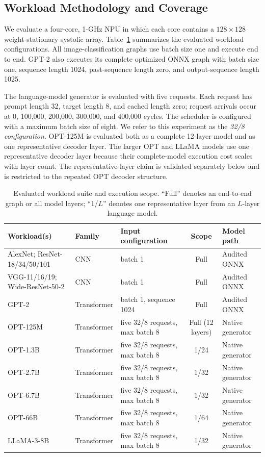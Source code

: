 \subsection{Workload Methodology and Coverage}
\label{sec:workload-methodology}

We evaluate a four-core, 1-GHz NPU in which each core contains a
$128\times128$ weight-stationary systolic array.  Table~\ref{tab:workload-suite}
summarizes the evaluated workload configurations.  All image-classification
graphs use batch size one and execute end to end.  GPT-2 also executes its
complete optimized ONNX graph with batch size one, sequence length 1024,
past-sequence length zero, and output-sequence length 1025.

The language-model generator is evaluated with five requests.  Each request
has prompt length 32, target length 8, and cached length zero; request arrivals
occur at 0, 100,000, 200,000, 300,000, and 400,000 cycles.  The scheduler is
configured with a maximum batch size of eight.  We refer to this experiment as
the \emph{32/8 configuration}.  OPT-125M is evaluated both as a complete
12-layer model and as one representative decoder layer.  The larger OPT and
LLaMA models use one representative decoder layer because their complete-model
execution cost scales with layer count.  The representative-layer claim is
validated separately below and is restricted to the repeated OPT decoder
structure.

\begin{table}[t]
  \centering
  \caption{Evaluated workload suite and execution scope.  ``Full'' denotes an
  end-to-end graph or all model layers; ``1/$L$'' denotes one representative
  layer from an $L$-layer language model.}
  \label{tab:workload-suite}
  \begin{tabular}{lllcl}
    \toprule
    Workload(s) & Family & Input configuration & Scope & Model path \\
    \midrule
    AlexNet; ResNet-18/34/50/101 & CNN & batch 1 & Full & Audited ONNX \\
    VGG-11/16/19; Wide-ResNet-50-2 & CNN & batch 1 & Full & Audited ONNX \\
    GPT-2 & Transformer & batch 1, sequence 1024 & Full & Audited ONNX \\
    OPT-125M & Transformer & five 32/8 requests, max batch 8 & Full (12 layers) & Native generator \\
    OPT-1.3B & Transformer & five 32/8 requests, max batch 8 & 1/24 & Native generator \\
    OPT-2.7B & Transformer & five 32/8 requests, max batch 8 & 1/32 & Native generator \\
    OPT-6.7B & Transformer & five 32/8 requests, max batch 8 & 1/32 & Native generator \\
    OPT-66B & Transformer & five 32/8 requests, max batch 8 & 1/64 & Native generator \\
    LLaMA-3-8B & Transformer & five 32/8 requests, max batch 8 & 1/32 & Native generator \\
    \bottomrule
  \end{tabular}
\end{table}

